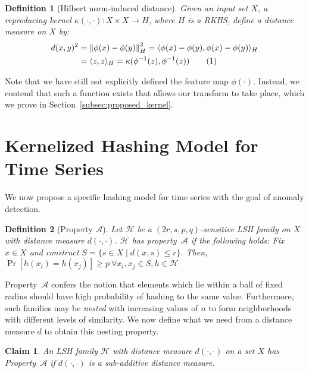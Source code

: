 \documentclass[a4paper]{article}
\newcommand\numberthis{\addtocounter{equation}{1}\tag{\theequation}}
\newcommand{\norm}[1]{\left\lVert#1\right\rVert}
\newcommand{\innerproduct}[2]{\langle{}#1,#2\rangle{}}
\theoremstyle{def}
\newtheorem{definition}{Definition}
\theoremstyle{thm}
\newtheorem{claim}[proposition]{Claim}
\newcommand{\LSH}[0]{\mathcal{H}}
\begin{document}
\begin{definition}[Hilbert norm-induced distance]
    Given an input set $X$, a reproducing kernel $\kappa(\cdot, \cdot) \colon X \times X \rightarrow H$, where $H$ is a RKHS, define a distance measure on $X$ by:
    \begin{align*}
        d(x,y)^2 &= \norm{\phi(x) - \phi(y)}_H^2 = \innerproduct{\phi(x) - \phi(y)}{\phi(x) - \phi(y)}_H \\
        &= \innerproduct{z}{z}_H = \kappa(\phi^{-1}(z), \phi^{-1}(z)) \numberthis
    \end{align*}
\end{definition}

Note that we have still not explicitly defined the feature map $\phi(\cdot)$.
Instead, we contend that such a function exists that allows our transform to take place, which we prove in Section~\ref{subsec:proposed_kernel}.

\section{Kernelized Hashing Model for Time Series}
\label{sec:kernel_hashing}

We now propose a specific hashing model for time series with the goal of anomaly detection.

\begin{definition}[Property $\mathscr{A}$]\label{defn:property_alpha}
    Let $\LSH$ be a $(2r, s, p, q)$-sensitive LSH family on $X$ with distance measure $d(\cdot, \cdot)$.
    $\LSH$ has property~$\mathscr{A}$ if the following holds:
    Fix $x \in X$ and construct $S = \{s \in X \mid d(x,s) \le r\}$.
    Then, $\Pr[h(x_i) = h(x_j)] \ge p~\forall x_i, x_j \in S, h \in \LSH$ 
\end{definition}

Property~$\mathscr{A}$ confers the notion that elements which lie within a ball of fixed radius should have high probability of hashing to the same value.
Furthermore, such families may be \textit{nested} with increasing values of $n$ to form neighborhoods with different levels of similarity.
We now define what we need from a distance measure $d$ to obtain this nesting property.

\begin{claim}\label{prop:property_alpha}
    An LSH family $\LSH$ with distance measure $d(\cdot, \cdot)$ on a set $X$ has Property~$\mathscr{A}$ if $d(\cdot, \cdot)$ is a sub-additive distance measure.
\end{claim}
\end{document}
